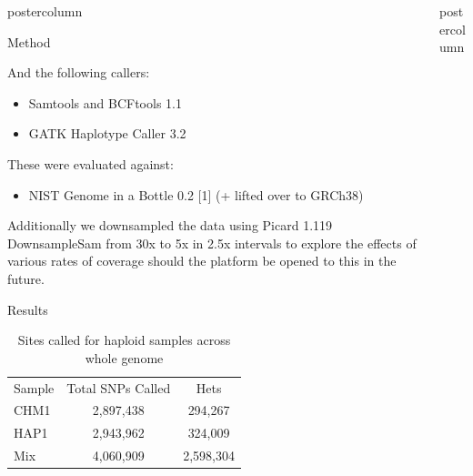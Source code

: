 \documentclass[final]{beamer}
\begin{document}
\begin{frame}{}
\begin{columns}
\begin{column}{.49\textwidth}
\begin{beamercolorbox}[center,wd=\textwidth]{postercolumn}
\begin{minipage}[T]{.95\textwidth}
\begin{block}{Method}
\begin{itemize}
                \end{itemize}
              And the following callers:
                \begin{itemize} 
                    \item Samtools and BCFtools 1.1
                    \item GATK Haplotype Caller 3.2
                \end{itemize}
              These were evaluated against:
                \begin{itemize} 
                    \item NIST Genome in a Bottle 0.2 [1] (+ lifted over to GRCh38)
                \end{itemize}
                Additionally we downsampled the data using Picard 1.119 DownsampleSam from 30x to 5x in 2.5x intervals to explore the effects of various rates of coverage should the platform be opened to this in the future.
            \end{block}
            \begin{block}{Results}
            \begin{table}[h]
\begin{tabular}{|l|c|c|}
\hline
Sample  & Total SNPs Called & Hets \\ \cline{1-3} %
CHM1 & 2,897,438 & 294,267  \\ %
HAP1 & 2,943,962 & 324,009 \\ %
Mix & 4,060,909 & 2,598,304   \\ \cline{1-3} %
\hline
\end{tabular}
\caption{Sites called for haploid samples across whole genome}
\label{table:1}
\end{table}

            \end{block}
            \vfill

            \end{minipage}
        \end{beamercolorbox}
    \end{column}
        \begin{column}{.49\textwidth}
        \begin{beamercolorbox}[center,wd=\textwidth]{postercolumn}
            \begin{minipage}[T]{.95\textwidth}  %



\end{minipage}
\end{beamercolorbox}
\end{column}
\end{columns}
\end{frame}
\end{document}
